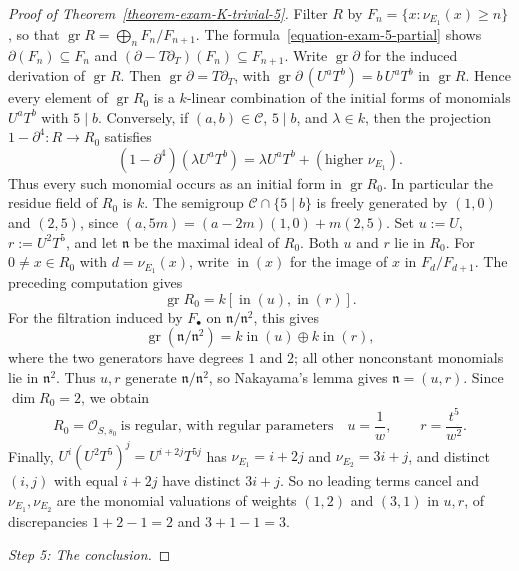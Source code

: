 \documentclass[reqno,oneside]{amsart}
\theoremstyle{definition}
\theoremstyle{plain}
\numberwithin{equation}{section}
\begin{document}
\begin{proof}[Proof of Theorem~\ref{theorem-exam-K-trivial-5}]
  Filter $R$ by $F_n=\{x:\nu_{E_1}(x)\ge n\}$, so that $\operatorname{gr}R=\bigoplus_n F_n/F_{n+1}$.
  The formula~\eqref{equation-exam-5-partial} shows $\partial(F_n)\subseteq F_n$ and $(\partial-T\partial_T)(F_n)\subseteq F_{n+1}$.
  Write $\operatorname{gr}\partial$ for the induced derivation of $\operatorname{gr}R$.
  Then $\operatorname{gr}\partial=T\partial_T$, with $\operatorname{gr}\partial\,(U^aT^b)=b\,U^aT^b$ in $\operatorname{gr} R$.
  Hence every element of $\operatorname{gr}R_0$ is a $k$-linear combination of the initial forms of monomials $U^aT^b$ with $5\mid b$.
  Conversely, if $(a,b)\in\mathcal C$, $5\mid b$, and $\lambda\in k$, then the projection $1-\partial^4:R\to R_0$ satisfies
  \[
    (1-\partial^4)(\lambda U^aT^b)=\lambda U^aT^b+(\text{higher }\nu_{E_1}).
  \]
  Thus every such monomial occurs as an initial form in $\operatorname{gr}R_0$.
  In particular the residue field of $R_0$ is $k$.
  The semigroup $\mathcal C\cap\{5\mid b\}$ is freely generated by $(1,0)$ and $(2,5)$, since $(a,5m)=(a-2m)(1,0)+m(2,5)$.
  Set $u:=U$, $r:=U^2T^5$, and let $\mathfrak n$ be the maximal ideal of $R_0$.
  Both $u$ and $r$ lie in $R_0$.  For $0\ne x\in R_0$ with $d=\nu_{E_1}(x)$, write $\operatorname{in}(x)$ for the image of $x$ in $F_d/F_{d+1}$.
  The preceding computation gives
  \[
    \operatorname{gr}R_0=k[\operatorname{in}(u),\operatorname{in}(r)].
  \]
  For the filtration induced by $F_\bullet$ on $\mathfrak n/\mathfrak n^2$, this gives
  \[
    \operatorname{gr}(\mathfrak n/\mathfrak n^2)
    =k\operatorname{in}(u)\oplus k\operatorname{in}(r),
  \]
  where the two generators have degrees $1$ and $2$; all other nonconstant monomials lie in $\mathfrak n^2$.
  Thus $u,r$ generate $\mathfrak n/\mathfrak n^2$, so Nakayama's lemma gives $\mathfrak n=(u,r)$.
  Since $\dim R_0=2$, we obtain
  \begin{equation}\label{equation-exam-5-germ}
    R_0=\mathcal O_{S,s_0}\ \text{is regular, with regular parameters}\quad
    u=\frac1w,\qquad r=\frac{t^5}{w^2} .
  \end{equation}
  Finally, $U^i(U^2T^5)^j=U^{i+2j}T^{5j}$ has $\nu_{E_1}=i+2j$ and $\nu_{E_2}=3i+j$, and distinct $(i,j)$ with equal $i+2j$ have distinct $3i+j$. 
  So no leading terms cancel and $\nu_{E_1},\nu_{E_2}$ are the monomial valuations of weights $(1,2)$ and $(3,1)$ in $u,r$, of discrepancies $1+2-1=2$ and $3+1-1=3$.


  \medskip
  \emph{Step 5: The conclusion.}
  

\end{proof}
\end{document}
